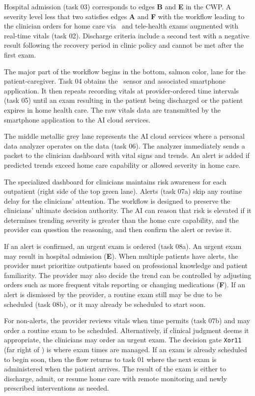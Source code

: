 Hospital admission (task 03) corresponds to edges \textbf{B} and \textbf{E} in the CWP. A severity level less that two satisfies edges \textbf{A} and \textbf{F} with the workflow leading to the clinician orders for home care via \phware\ and tele-health exams augmented with real-time vitals (task 02). Discharge criteria include a second test with a negative result following the recovery period in clinic policy and cannot be met after the first exam.

The major part of the workflow begins in the bottom, salmon color, lane for the patient-caregiver. Task 04 obtains the \phware\ sensor and associated smartphone application. It then repeats recording vitals at provider-ordered time intervals (task 05) until an exam resulting in the patient being discharged or the patient expires in home health care. The raw vitals data are transmitted by the smartphone application to the AI cloud services. 

The middle metallic grey lane represents the AI cloud services where a personal data analyzer operates on the data (task 06).  The analyzer immediately sends a packet to the clinician dashboard with vital signs and trends. An alert is added if predicted trends exceed home care capability or allowed severity in home care.

The specialized dashboard for clinicians maintains risk awareness for each outpatient (right side of the top green lane). Alerts (task 07a) skip any routine delay for the clinicians' attention. The workflow is designed to preserve the clinicians' ultimate decision authority. The AI can reason that risk is elevated if it determines trending severity is greater than the home care capability, and the provider can question the reasoning, and then confirm the alert or revise it. 

If an alert is confirmed, an urgent exam is ordered (task 08a). An urgent exam may result in hospital admission (\textbf{E}). When multiple patients have alerts, the provider must prioritize outpatients based on professional knowledge and patient familiarity. The provider may also decide the trend can be controlled by adjusting orders such as more frequent vitals reporting or changing medications (\textbf{F}). If an alert is dismissed by the provider, a routine exam still may be due to be scheduled (task 08b), or it may already be scheduled to start soon. 

For non-alerts, the provider reviews vitals when time permits (task 07b) and may order a routine exam to be scheduled. Alternatively, if clinical judgment deems it appropriate, the clinicians may order an urgent exam. The decision gate \texttt{Xor11} (far right of ) is where exam times are managed. If an exam is already scheduled to begin soon, then the flow returns to task 01 where the next exam is administered when the patient arrives. The result of the exam is either to discharge, admit, or resume home care with remote monitoring and newly prescribed interventions as needed.

